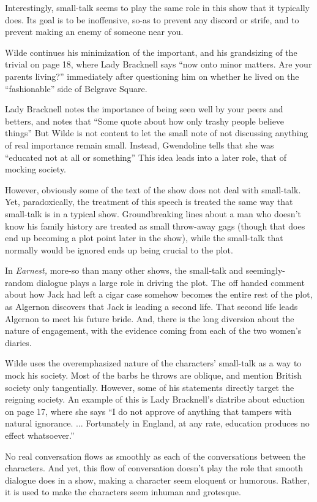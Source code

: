 \documentclass[12pt]{article}[titlepage]
\newcommand{\say}[1]{``#1''}
\newcommand{\1}{\={a}}
\newcommand{\2}{\={e}}
\newcommand{\3}{\={\i}}
\newcommand{\4}{\=o}
\newcommand{\5}{\=u}
\newcommand{\6}{\={A}}
\renewcommand{\,}{\textsuperscript{,}}
\begin{document}
Interestingly, small-talk seems to play the same role in this show that it typically does.
Its goal is to be inoffensive, so-as to prevent any discord or strife, and to prevent making an enemy of someone near you.

Wilde continues his minimization of the important, and his grandsizing of the trivial on page 18, where Lady Bracknell says \say{now onto minor matters. Are your parents living?} immediately after questioning him on whether he lived on the \say{fashionable} side of Belgrave Square.

Lady Bracknell notes the importance of being seen well by your peers and betters, and notes that \say{Some quote about how only trashy people believe things}
But Wilde is not content to let the small note of not discussing anything of real importance remain small.
Instead, Gwendoline tells that she was \say{educated not at all or something}
This idea leads into a later role, that of mocking society.

However, obviously some of the text of the show does not deal with small-talk.
Yet, paradoxically, the treatment of this speech is treated the same way that small-talk is in a typical show.
Groundbreaking lines about a man who doesn't know his family history are treated as small throw-away gags (though that does end up becoming a plot point later in the show), while the small-talk that normally would be ignored ends up being crucial to the plot.

In \textit{Earnest,} more-so than many other shows, the small-talk and seemingly-random dialogue plays a large role in driving the plot.
The off handed comment about how Jack had left a cigar case somehow becomes the entire rest of the plot, as Algernon discovers that Jack is leading a second life.
That second life leads Algernon to meet his future bride.
And, there is the long diversion about the nature of engagement, with the evidence coming from each of the two women's diaries.

Wilde uses the overemphasized nature of the characters' small-talk as a way to mock his society.
Most of the barbs he throws are oblique, and mention British society only tangentially.
However, some of his statements directly target the reigning society.
An example of this is Lady Bracknell's diatribe about eduction on page 17, where she says \say{I do not approve of anything that tampers with natural ignorance. ... Fortunately in England, at any rate, education produces no effect whatsoever.}
 
No real conversation flows as smoothly as each of the conversations between the characters.
And yet, this flow of conversation doesn't play the role that smooth dialogue does in a show, making a character seem eloquent or humorous.
Rather, it is used to make the characters seem inhuman and grotesque.
\end{document}
